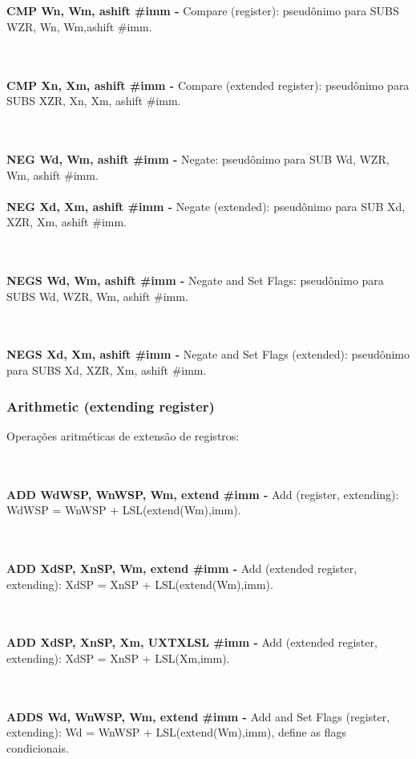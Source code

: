 \documentclass[12pt,a4paper,utf8]{ppgsi}
\begin{document}
\\\\\textbf{CMP Wn, Wm{, ashift \#imm} -} Compare (register): pseudônimo para SUBS WZR, Wn, Wm{,ashift \#imm}. 

\\\\\textbf{CMP Xn, Xm{, ashift \#imm} -} Compare (extended register): pseudônimo para SUBS XZR, Xn, Xm{, ashift \#imm}. 

\\\\\textbf{NEG Wd, Wm{, ashift \#imm} -} Negate: pseudônimo para SUB Wd, WZR, Wm{, ashift \#imm}. 
\\\\\textbf{NEG Xd, Xm{, ashift \#imm} -} Negate (extended): pseudônimo para SUB Xd, XZR, Xm{, ashift \#imm}. 

\\\\\textbf{NEGS Wd, Wm{, ashift \#imm} -} Negate and Set Flags: pseudônimo para SUBS Wd, WZR, Wm{, ashift \#imm}. 

\\\\\textbf{NEGS Xd, Xm{, ashift \#imm} -} Negate and Set Flags (extended): pseudônimo para SUBS Xd, XZR, Xm{, ashift \#imm}. 



\subsubsection{Arithmetic (extending register)}
Operações aritméticas de extensão de registros:

\\\\\textbf{ADD Wd\textbar WSP, Wn\textbar WSP, Wm, extend {#imm} -} Add (register, extending): Wd\textbar WSP = Wn\textbar WSP + LSL(extend(Wm),imm). 

\\\\\textbf{ADD Xd\textbar SP, Xn\textbar SP, Wm, extend {#imm} -} Add (extended register, extending): Xd\textbar SP = Xn\textbar SP + LSL(extend(Wm),imm). 

\\\\\textbf{ADD Xd\textbar SP, Xn\textbar SP, Xm{, UXTX\textbar LSL \#imm} -} Add (extended register, extending): Xd\textbar SP = Xn\textbar SP + LSL(Xm,imm). 

\\\\\textbf{ADDS Wd, Wn\textbar WSP, Wm, extend {#imm} -} Add and Set Flags (register, extending): Wd = Wn\textbar WSP + LSL(extend(Wm),imm), define as flags condicionais.  
\end{document}
